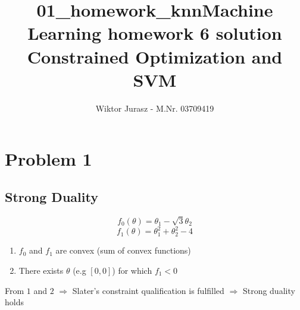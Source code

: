 \documentclass{article}
\title{01\_homework\_knn}
\begin{document}
\title{Machine Learning homework 6 solution \\
        \large Constrained Optimization and SVM}
        \author{Wiktor Jurasz - M.Nr. 03709419}
\maketitle
\section{Problem 1}
\subsection{Strong Duality}
\begin{equation}
    f_0(\theta) = \theta_1 - \sqrt{3}\theta_2
\end{equation}
\begin{equation}
    f_1(\theta) = \theta_1^2 + \theta_2^2 -4
\end{equation}
\begin{enumerate}
    \item $f_0$ and $f_1$ are convex (sum of convex functions)
    \item There exists $\theta$ (e.g $[0,0]$) for which $f_1 < 0$
\end{enumerate}
From $1$ and $2$ $\Rightarrow$ Slater's constraint qualification is fulfilled 
$\Rightarrow$ Strong duality holds
\end{document}
